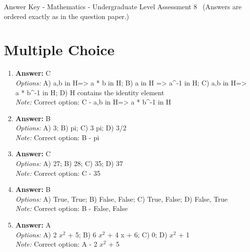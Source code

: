 \documentclass[12pt]{article}
\begin{document}
\begin{center}
Answer Key - Mathematics - Undergraduate Level Assessment 8 \
\small (Answers are ordered exactly as in the question paper.)
\end{center}

\section*{Multiple Choice}
\begin{enumerate}[label=\arabic*.]
\item \textbf{Answer:} C
\\ \textit{Options:} A) a,b in H=\textgreater{} a * b in H; B) a in H =\textgreater{} a^-1 in H; C) a,b in H=\textgreater{} a * b^-1 in H; D) H contains the identity element
\\ \textit{Note:} Correct option: C - a,b in H=\textgreater{} a * b^-1 in H
\item \textbf{Answer:} B
\\ \textit{Options:} A) 3; B) pi; C) 3 pi; D) 3/2
\\ \textit{Note:} Correct option: B - pi
\item \textbf{Answer:} C
\\ \textit{Options:} A) 27; B) 28; C) 35; D) 37
\\ \textit{Note:} Correct option: C - 35
\item \textbf{Answer:} B
\\ \textit{Options:} A) True, True; B) False, False; C) True, False; D) False, True
\\ \textit{Note:} Correct option: B - False, False
\item \textbf{Answer:} A
\\ \textit{Options:} A) 2 $x^2$ + 5; B) 6 $x^2$ + 4 x + 6; C) 0; D) $x^2$ + 1
\\ \textit{Note:} Correct option: A - 2 $x^2$ + 5
\end{enumerate}
\end{document}
